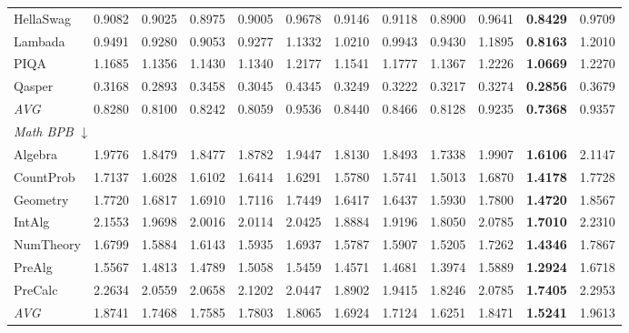 \begin{table}[htbp]
\begin{tabular}{lccccccccccc}
HellaSwag & 0.9082 & 0.9025 & 0.8975 & 0.9005 & 0.9678 & 0.9146 & 0.9118 & 0.8900 & 0.9641 & \textbf{0.8429} & 0.9709 \\
Lambada & 0.9491 & 0.9280 & 0.9053 & 0.9277 & 1.1332 & 1.0210 & 0.9943 & 0.9430 & 1.1895 & \textbf{0.8163} & 1.2010 \\
PIQA & 1.1685 & 1.1356 & 1.1430 & 1.1340 & 1.2177 & 1.1541 & 1.1777 & 1.1367 & 1.2226 & \textbf{1.0669} & 1.2270 \\
Qasper & 0.3168 & 0.2893 & 0.3458 & 0.3045 & 0.4345 & 0.3249 & 0.3222 & 0.3217 & 0.3274 & \textbf{0.2856} & 0.3679 \\
\textit{AVG} & 0.8280 & 0.8100 & 0.8242 & 0.8059 & 0.9536 & 0.8440 & 0.8466 & 0.8128 & 0.9235 & \textbf{0.7368} & 0.9357 \\
\midrule
\multicolumn{12}{l}{\textit{Math BPB} $\downarrow$} \\
Algebra & 1.9776 & 1.8479 & 1.8477 & 1.8782 & 1.9447 & 1.8130 & 1.8493 & 1.7338 & 1.9907 & \textbf{1.6106} & 2.1147 \\
CountProb & 1.7137 & 1.6028 & 1.6102 & 1.6414 & 1.6291 & 1.5780 & 1.5741 & 1.5013 & 1.6870 & \textbf{1.4178} & 1.7728 \\
Geometry & 1.7720 & 1.6817 & 1.6910 & 1.7116 & 1.7449 & 1.6417 & 1.6437 & 1.5930 & 1.7800 & \textbf{1.4720} & 1.8567 \\
IntAlg & 2.1553 & 1.9698 & 2.0016 & 2.0114 & 2.0425 & 1.8884 & 1.9196 & 1.8050 & 2.0785 & \textbf{1.7010} & 2.2310 \\
NumTheory & 1.6799 & 1.5884 & 1.6143 & 1.5935 & 1.6937 & 1.5787 & 1.5907 & 1.5205 & 1.7262 & \textbf{1.4346} & 1.7867 \\
PreAlg & 1.5567 & 1.4813 & 1.4789 & 1.5058 & 1.5459 & 1.4571 & 1.4681 & 1.3974 & 1.5889 & \textbf{1.2924} & 1.6718 \\
PreCalc & 2.2634 & 2.0559 & 2.0658 & 2.1202 & 2.0447 & 1.8902 & 1.9415 & 1.8246 & 2.0785 & \textbf{1.7405} & 2.2953 \\
\textit{AVG} & 1.8741 & 1.7468 & 1.7585 & 1.7803 & 1.8065 & 1.6924 & 1.7124 & 1.6251 & 1.8471 & \textbf{1.5241} & 1.9613 \\
\bottomrule
\end{tabular}
\end{table}

